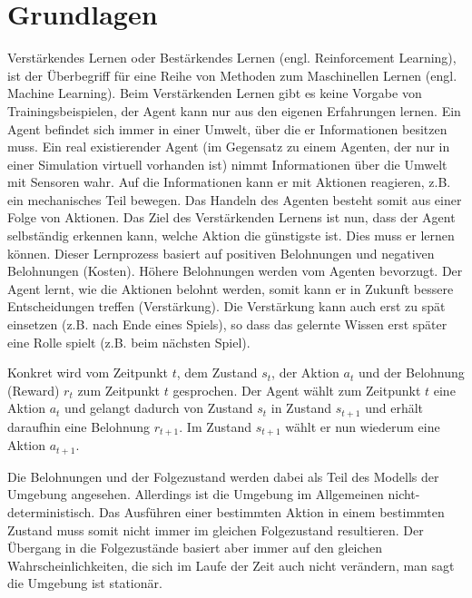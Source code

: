 \documentclass[10pt]{scrartcl}
\author{Steffen Brauer, André Harms,\\ Florian Johannßen, Jan Meier,\\ Florian Ocker, Olaf Potratz,\\ Torben Woggan}
\title{\titletext}
\date{10.06.2012}
\begin{document}
\maketitle

\setcounter{tocdepth}{3}
\tableofcontents

	\listoffigures  
\newpage
\section{Grundlagen}
Verstärkendes Lernen oder Bestärkendes Lernen (engl. Reinforcement Learning), ist der Überbegriff für eine Reihe von Methoden zum Maschinellen Lernen (engl. Machine Learning). Beim Verstärkenden Lernen gibt es keine Vorgabe von Trainingsbeispielen, der Agent kann nur aus den eigenen Erfahrungen lernen. Ein Agent befindet sich immer in einer Umwelt, über die er Informationen besitzen muss. Ein real existierender Agent (im Gegensatz zu einem Agenten, der nur in einer Simulation virtuell vorhanden ist) nimmt Informationen über die Umwelt mit Sensoren wahr. Auf die Informationen kann er mit Aktionen reagieren, z.B. ein mechanisches Teil bewegen. Das Handeln des Agenten besteht somit aus einer Folge von Aktionen. Das Ziel des Verstärkenden Lernens ist nun, dass der Agent selbständig erkennen kann, welche Aktion die günstigste ist. Dies muss er lernen können. Dieser Lernprozess basiert auf positiven Belohnungen und negativen Belohnungen (Kosten). Höhere Belohnungen werden vom Agenten bevorzugt. Der Agent lernt, wie die Aktionen belohnt werden, somit kann er in Zukunft bessere Entscheidungen treffen (Verstärkung). Die Verstärkung kann auch erst zu spät einsetzen (z.B. nach Ende eines Spiels), so dass das gelernte Wissen erst später eine Rolle spielt (z.B. beim nächsten Spiel).

Konkret wird vom Zeitpunkt $t$, dem Zustand $s_t$, der Aktion $a_t$ und der Belohnung (Reward) $r_t$ zum Zeitpunkt $t$ gesprochen. Der Agent wählt zum Zeitpunkt $t$ eine Aktion $a_t$ und gelangt dadurch von Zustand $s_t$ in Zustand $s_{t+1}$ und erhält daraufhin eine Belohnung $r_{t+1}$. Im Zustand $s_{t+1}$ wählt er nun wiederum eine Aktion $a_{t+1}$.

Die Belohnungen und der Folgezustand werden dabei als Teil des Modells der Umgebung angesehen. Allerdings ist die Umgebung im Allgemeinen nicht-deterministisch. Das Ausführen einer bestimmten Aktion in einem bestimmten Zustand muss somit nicht immer im gleichen Folgezustand resultieren. Der Übergang in die Folgezustände basiert aber immer auf den gleichen Wahrscheinlichkeiten, die sich im Laufe der Zeit auch nicht verändern, man sagt die Umgebung ist stationär.
\end{document}
